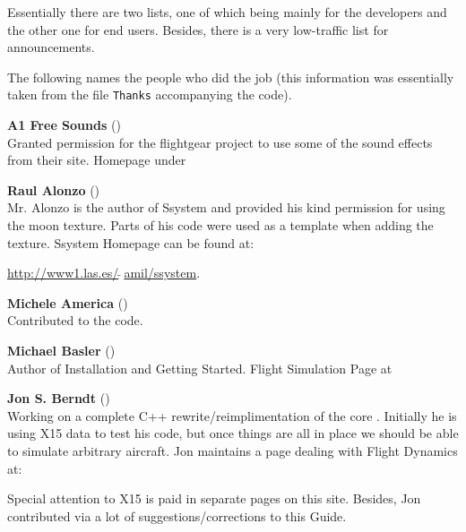 \noindent
 Essentially there are two lists, one of which being mainly for the developers
and the other one for end users. Besides, there is a very low-traffic list for
announcements.
\medskip

 \noindent
The following names the people who did the job (this information was essentially taken
from the file \texttt{Thanks} accompanying the code).
 \medskip

\noindent \textbf{A1 Free Sounds} ()\\
   Granted permission for the flightgear project to use some of the sound effects from their  
   site. Homepage under   
   \medskip
   
   \href{http://www.a1freesoundeffects.com}
   \medskip

\noindent \textbf{Raul Alonzo} ()\\
   Mr. Alonzo is the
 author of Ssystem and provided his kind permission for using the moon texture.
 Parts of his code were used as a template when adding the texture.
  Ssystem Homepage can be found at:
   \medskip

  \href{http://www1.las.es/~amil/ssystem}{http://www1.las.es/$\tilde{~~}$amil/ssystem}.
 \medskip

 \noindent \textbf{Michele America}
()\\
  Contributed to the  code.
 \medskip

\noindent \textbf{Michael Basler} ()\\
 Author of Installation and Getting Started. Flight Simulation Page at
  \medskip

\medskip

\noindent \textbf{Jon S. Berndt} ()\\
 Working on a complete C++ rewrite/reimplimentation of the core .
  Initially he is using X15 data to test his code, but once things are
  all in place we should be able to simulate arbitrary aircraft. Jon
  maintains a page dealing with Flight Dynamics at:
   \medskip

   \medskip

\noindent
  Special attention to X15 is paid in separate pages on this site. Besides, Jon
  contributed via a lot of suggestions/corrections to this Guide.
\medskip

